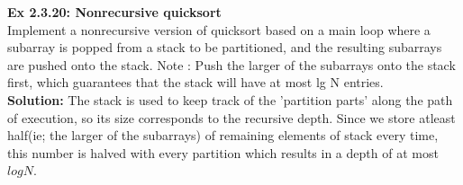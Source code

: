 \documentclass[11pt,fleqn]{article}
\begin{document}
\textbf{Ex 2.3.20: Nonrecursive quicksort}\\ Implement a nonrecursive version of quicksort based
on a main loop where a subarray is popped from a stack to be partitioned, and the resulting
subarrays are pushed onto the stack. Note : Push the larger of the subarrays onto
the stack first, which guarantees that the stack will have at most lg N entries.\\
	
\textbf{Solution:}
The stack is used to keep track of the 'partition parts' along the path of execution, so its size corresponds to the recursive depth. Since we store atleast half(ie; the larger of the subarrays) of remaining elements of stack every time, this number is halved with every partition which results in a depth of at most $logN$.
\end{document}
